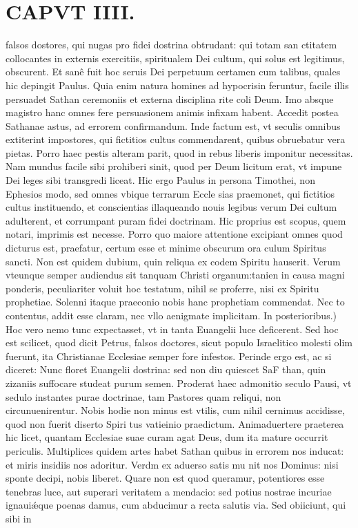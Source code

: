 \documentclass{article}
\begin{document}
\begin{pages}
\subsection*{\textit{}}
\section*{CAPVT IIII. }
\marginpar{[ p.43 ]}\pstart falsos dostores, qui nugas pro fidei dostrina obtrudant: qui totam san ctitatem collocantes in externis exercitiis, spiritualem Dei cultum, qui solus est legitimus, obscurent. Et sanê fuit hoc seruis Dei perpetuum certamen cum talibus, quales hic depingit Paulus. Quia enim natura homines ad hypocrisin feruntur, facile illis persuadet Sathan ceremoniis et externa disciplina rite coli Deum. Imo absque magistro hanc omnes fere persuasionem animis infixam habent. Accedit postea Sathanae astus, ad errorem confirmandum. Inde factum est, vt seculis omnibus extiterint impostores, qui fictitios cultus commendarent, quibus obruebatur vera pietas. Porro haec pestis alteram parit, quod in rebus liberis imponitur necessitas. Nam mundus facile sibi prohiberi sinit, quod per Deum licitum erat, vt impune Dei leges sibi transgredi liceat. Hic ergo Paulus in persona Timothei, non Ephesios modo, sed omnes vbique terrarum Eccle sias praemonet, qui fictitios cultus instituendo, et conscientias illaqueando nouis legibus verum Dei cultum adulterent, et corrumpant puram fidei doctrinam. Hic proprius est scopus, quem notari, imprimis est necesse. Porro quo maiore attentione excipiant omnes quod dicturus est, praefatur, certum esse et minime obscurum ora culum Spiritus sancti. Non est quidem dubium, quin reliqua ex codem Spiritu hauserit. Verum vteunque semper audiendus sit tanquam Christi organum:tanien in causa magni ponderis, peculiariter voluit hoc testatum, nihil se proferre, nisi ex Spiritu prophetiae. Solenni itaque praeconio nobis hanc prophetiam commendat. Nec to contentus, addit esse claram, nec vllo aenigmate implicitam.  \pend\pstart In posterioribus.) Hoc vero nemo tunc expectasset, vt in tanta Euangelii luce deficerent. Sed hoc est scilicet, quod dicit Petrus, falsos doctores, sicut populo Israelitico molesti olim fuerunt, ita Christianae Ecclesiae semper fore infestos. Perinde ergo est, ac si diceret: Nunc floret Euangelii dostrina: sed non diu quiescet SaF than, quin zizaniis suffocare studeat purum semen. Proderat haec admonitio seculo Pausi, vt sedulo instantes purae doctrinae, tam Pastores quam reliqui, non circunuenirentur. Nobis hodie non minus est vtilis, cum nihil cernimus accidisse, quod non fuerit diserto Spiri tus vatieinio praedictum. Animaduertere praeterea hic licet, quantam Ecclesiae suae curam agat Deus, dum ita mature occurrit periculis. Multiplices quidem artes habet Sathan quibus in errorem nos inducat: et miris insidiis nos adoritur. Verdm ex aduerso satis mu nit nos Dominus: nisi sponte decipi, nobis liberet. Quare non est quod queramur, potentiores esse tenebras luce, aut superari veritatem a mendacio: sed potius nostrae incuriae ignauiǽque poenas damus, cum abducimur a recta salutis via. Sed obiiciunt, qui sibi in  \pend

\end{pages}
\end{document}

